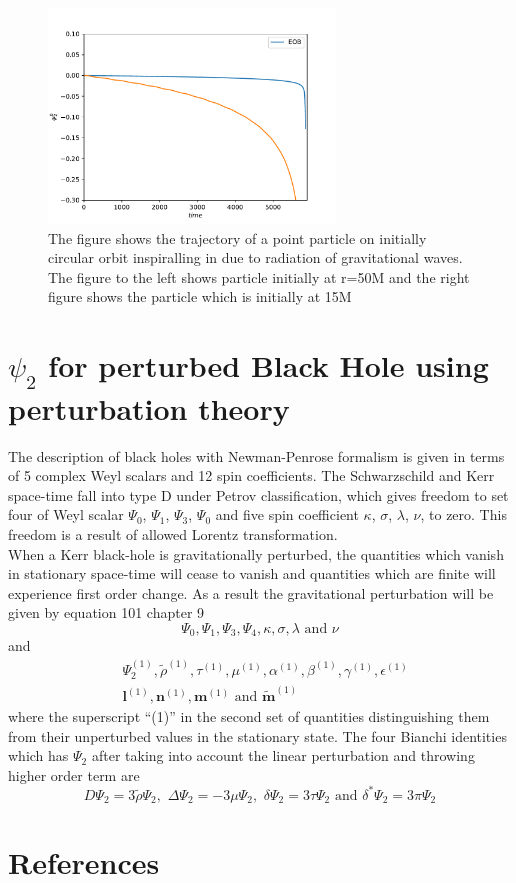 \documentclass[prd,preprintnumbers,onecolumn,eqsecnum,floatfix,letter]{revtex4}
\begin{document}
\begin{figure}
	\includegraphics[width=3.0in]{../plots/Psi2EOBHamiltonia.pdf}
	\caption{The figure shows the trajectory of a point particle on initially circular orbit inspiralling in due to radiation of gravitational waves. The figure to the left shows particle initially at r=50M and the right figure shows the particle which is initially at 15M}
	\label{fig:BoBFig}
\end{figure} 

\section{$\psi_{2}$ for perturbed Black Hole using perturbation theory}
The description of black holes with Newman-Penrose formalism is given in terms of 5 complex Weyl scalars and 12 spin coefficients. The Schwarzschild and Kerr space-time fall into type D under Petrov classification, which gives freedom to set four of Weyl scalar $\Psi_0$, $\Psi_1$, $\Psi_3$, $\Psi_0$ and five spin coefficient $\kappa$, $\sigma$, $\lambda$, $\nu$,  to zero. This freedom is a result of allowed Lorentz transformation. \\
When a Kerr black-hole is gravitationally perturbed, the quantities which vanish in stationary space-time will cease to vanish and quantities which are finite will experience first order change. As a result the gravitational perturbation will be given by equation 101 chapter 9 \cite{Chandrasekhar:579245}      
\begin{equation}
	\Psi_0, \Psi_1, \Psi_3, \Psi_4, \kappa, \sigma, \lambda \, \, \text{and} \, \,\nu
\end{equation}
and 
\begin{align}
	&\Psi_{2}^{\left(1\right)}, \tilde{\rho}^{\left(1\right)}, \tau^{\left(1\right)}, \mu^{\left(1\right)}, \alpha^{\left(1\right)}, \beta^{\left(1\right)}, \gamma^{\left(1\right)}, \epsilon^{\left(1\right)} \nonumber \\
	&\boldsymbol{l}^{\left(1\right)}, \boldsymbol{n}^{\left(1\right)}, \boldsymbol{m}^{\left(1\right)} \,\, \text{and} \,\, \boldsymbol{\tilde{m}}^{\left(1\right)}
\end{align}
where the superscript ``(1)'' in the second set of quantities distinguishing them from their unperturbed values in the stationary state. The four Bianchi identities which has $\Psi_{2}$ after taking into account the linear perturbation and throwing higher order term are 
\begin{equation}
	D\Psi_{2} = 3\tilde{\rho}\Psi_{2}, \,\, \Delta\Psi_{2} = -3\mu\Psi_{2},  \,\, \delta\Psi_{2} = 3\tau\Psi_{2} \,\, \text{and} \,\, \delta^{*}\Psi_{2} = 3\pi\Psi_{2}
\end{equation}  
\section*{References}



\end{document}
